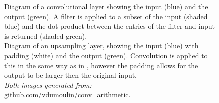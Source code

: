 \documentclass[11pt,a4paper,onecolumn]{report}
\begin{document}
\begin{figure}%
  \centering
  \qquad
  \caption[ Diagram of a convolutional layer  Diagram of an upsampling layer]{ Diagram of a convolutional layer showing the input (blue) and the output (green). A filter is applied to a subset of the input (shaded blue) and the dot product between the entries of the filter and input is returned (shaded green). \\
   Diagram of an upsampling layer, showing the input (blue) with padding (white) and the output (green). Convolution is applied to this in the same way as in , however the padding allows for the output to be larger then the original input.\\
  \textit{Both images generated from:} \url{github.com/vdumoulin/conv_arithmetic}.}
  \end{figure}

%
\end{document}
